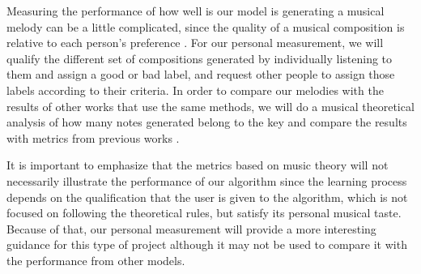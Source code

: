 Measuring the performance of how well is our model is generating a musical melody can be a little complicated, since the quality of a musical composition is relative to each person's preference \cite{biles2013lessons}. For our personal measurement, we will qualify the different set of compositions generated by individually listening to them and assign a good or bad label, and request other people to assign those labels according to their criteria. In order to compare our melodies with the results of other works that use the same methods, we will do a musical theoretical analysis of how many notes generated belong to the key and compare the results with metrics from previous works \cite{deeprl2016music}.

It is important to emphasize that the metrics based on music theory will not necessarily illustrate the performance of our algorithm since the learning process depends on the qualification that the user is given to the algorithm, which is not focused on following the theoretical rules, but satisfy its personal musical taste. Because of that, our personal measurement will provide a more interesting guidance for this type of project although it may not be used to compare it with the performance from other models.